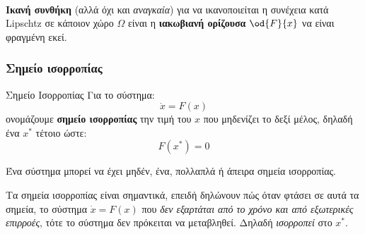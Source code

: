 \documentclass[11pt,a4paper,notitlepage,fleqn]{article}
\begin{document}
\paragraph{}
\textbf{Ικανή συνθήκη} (αλλά όχι και \textit{αναγκαία}) για να ικανοποιείται η συνέχεια
κατά Lipschtz σε κάποιον χώρο \( \Omega \) είναι η \textbf{ιακωβιανή ορίζουσα} \( \od{F}{x} \) να είναι φραγμένη εκεί.

\subsubsection{Σημείο ισορροπίας}
\begin{defn}{Σημείο Ισορροπίας}{}
	Για το σύστημα:\[
	\dot x = F(x)
	\]
	ονομάζουμε \textbf{σημείο ισορροπίας} την τιμή του \( x \) που μηδενίζει το δεξί μέλος,
	δηλαδή ένα \( x^* \) τέτοιο ώστε:
	\[
	F(x^*) = 0
	\]

	Ένα σύστημα μπορεί να έχει μηδέν, ένα, πολλαπλά ή άπειρα σημεία ισορροπίας.
\end{defn}

Τα σημεία ισορροπίας είναι σημαντικά, επειδή δηλώνουν πώς όταν φτάσει σε αυτά τα σημεία, το σύστημα
\( \dot x = F(x) \) που \textit{δεν εξαρτάται από το χρόνο και από εξωτερικές επιρροές},
τότε το σύστημα δεν πρόκειται να μεταβληθεί. Δηλαδή \textit{ισορροπεί} στο \( x^* \).
\end{document}
